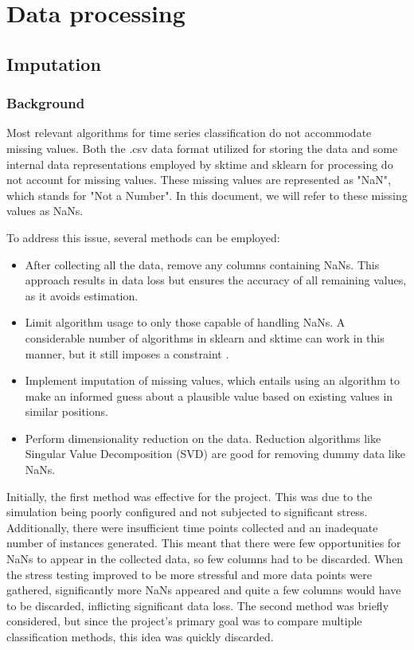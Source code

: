 \chapter{Data processing}

\section{Imputation}

\subsection{Background}
Most relevant algorithms for time series classification do not accommodate missing values. Both the .csv data format utilized for storing the data and some internal data representations employed by sktime and sklearn for processing do not account for missing values. These missing values are represented as "NaN", which stands for "Not a Number". In this document, we will refer to these missing values as NaNs.

To address this issue, several methods can be employed:
\begin{itemize}
\item After collecting all the data, remove any columns containing NaNs. This approach results in data loss but ensures the accuracy of all remaining values, as it avoids estimation.
\item Limit algorithm usage to only those capable of handling NaNs. A considerable number of algorithms in sklearn and sktime can work in this manner, but it still imposes a constraint \cite*{Scikit-learn-imputation}.
\item Implement imputation of missing values, which entails using an algorithm to make an informed guess about a plausible value based on existing values in similar positions.
\item Perform dimensionality reduction on the data. Reduction algorithms like Singular Value Decomposition (SVD) are good for removing dummy data like NaNs.
\end{itemize}

Initially, the first method was effective for the project. This was due to the simulation being poorly configured and not subjected to significant stress. Additionally, there were insufficient time points collected and an inadequate number of instances generated. This meant that there were few opportunities for NaNs to appear in the collected data, so few columns had to be discarded. When the stress testing improved to be more stressful and more data points were gathered, significantly more NaNs appeared and quite a few columns would have to be discarded, inflicting significant data loss.
The second method was briefly considered, but since the project's primary goal was to compare multiple classification methods, this idea was quickly discarded.

